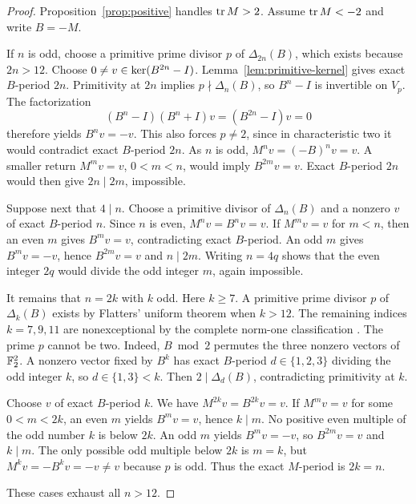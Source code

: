 \documentclass[11pt]{article}
\theoremstyle{definition}
\theoremstyle{remark}
\begin{document}
\begin{proof}
Proposition~\ref{prop:positive} handles \(\operatorname{tr} M>2\).  Assume
\(\operatorname{tr} M<-2\) and write \(B=-M\).

If \(n\) is odd, choose a primitive prime divisor \(p\) of
\(\Delta_{2n}(B)\), which exists because \(2n>12\).  Choose
\(0\ne v\in\operatorname{ker}(B^{2n}-I)\).  Lemma~\ref{lem:primitive-kernel} gives exact
\(B\)-period \(2n\).  Primitivity at \(2n\) implies
\(p\nmid\Delta_n(B)\), so \(B^n-I\) is invertible on \(V_p\).  The
factorization
\begin{equation}
  (B^n-I)(B^n+I)v=(B^{2n}-I)v=0
\end{equation}
therefore yields \(B^nv=-v\).  This also forces \(p\ne2\), since in
characteristic two it would contradict exact \(B\)-period \(2n\).  As
\(n\) is odd, \(M^nv=(-B)^nv=v\).  A smaller return \(M^mv=v\),
\(0<m<n\), would imply \(B^{2m}v=v\).  Exact \(B\)-period \(2n\) would
then give \(2n\mid2m\), impossible.

Suppose next that \(4\mid n\).  Choose a primitive divisor of
\(\Delta_n(B)\) and a nonzero \(v\) of exact \(B\)-period \(n\).  Since
\(n\) is even, \(M^nv=B^nv=v\).  If \(M^mv=v\) for \(m<n\), then an even
\(m\) gives \(B^mv=v\), contradicting exact \(B\)-period.  An odd \(m\)
gives \(B^mv=-v\), hence \(B^{2m}v=v\) and \(n\mid2m\).  Writing
\(n=4q\) shows that the even integer \(2q\) would divide the odd integer
\(m\), again impossible.

It remains that \(n=2k\) with \(k\) odd.  Here \(k\ge7\).  A primitive
prime divisor \(p\) of \(\Delta_k(B)\) exists by Flatters' uniform theorem
when \(k>12\).  The remaining indices \(k=7,9,11\) are nonexceptional by
the complete norm-one classification
\citep[Theorem~3.1]{Flatters2009Primitive}.  The prime \(p\) cannot be two.
Indeed, \(B\bmod2\) permutes the three nonzero vectors of \(\mathbb{F}_2^2\).  A
nonzero vector fixed by \(B^k\) has exact \(B\)-period
\(d\in\{1,2,3\}\) dividing the odd integer \(k\), so
\(d\in\{1,3\}<k\).  Then \(2\mid\Delta_d(B)\), contradicting primitivity
at \(k\).

Choose \(v\) of exact \(B\)-period \(k\).  We have
\(M^{2k}v=B^{2k}v=v\).  If \(M^mv=v\) for some \(0<m<2k\), an even
\(m\) yields \(B^mv=v\), hence \(k\mid m\).  No positive even multiple of
the odd number \(k\) is below \(2k\).  An odd \(m\) yields
\(B^mv=-v\), so \(B^{2m}v=v\) and \(k\mid m\).  The only possible odd
multiple below \(2k\) is \(m=k\), but
\(M^kv=-B^kv=-v\ne v\) because \(p\) is odd.  Thus the exact
\(M\)-period is \(2k=n\).

These cases exhaust all \(n>12\).
\end{proof}
\end{document}
